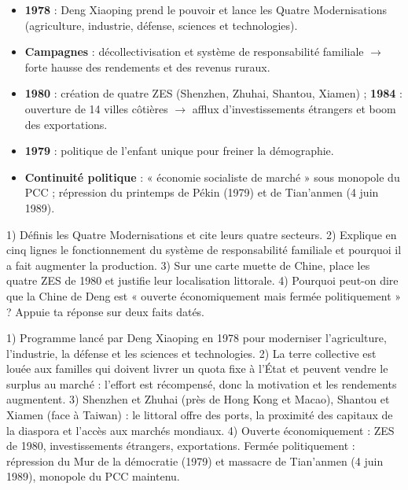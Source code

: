 \documentclass[11pt]{article}
\newcommand{\cle}[1]{{\popxbold\color{popdark}#1}}
\begin{document}
\begin{aretenir}
\begin{itemize}
\item \textbf{1978} : Deng Xiaoping prend le pouvoir et lance les \cle{Quatre Modernisations} (agriculture, industrie, défense, sciences et technologies).
\item \textbf{Campagnes} : décollectivisation et système de responsabilité familiale $\rightarrow$ forte hausse des rendements et des revenus ruraux.
\item \textbf{1980} : création de quatre \cle{ZES} (Shenzhen, Zhuhai, Shantou, Xiamen) ; \textbf{1984} : ouverture de 14 villes côtières $\rightarrow$ afflux d'investissements étrangers et boom des exportations.
\item \textbf{1979} : politique de l'\cle{enfant unique} pour freiner la démographie.
\item \textbf{Continuité politique} : « économie socialiste de marché » sous monopole du PCC ; répression du printemps de Pékin (1979) et de \cle{Tian'anmen} (4 juin 1989).
\end{itemize}
\end{aretenir}

\begin{exercice}
1) Définis les Quatre Modernisations et cite leurs quatre secteurs. 2) Explique en cinq lignes le fonctionnement du système de responsabilité familiale et pourquoi il a fait augmenter la production. 3) Sur une carte muette de Chine, place les quatre ZES de 1980 et justifie leur localisation littorale. 4) Pourquoi peut-on dire que la Chine de Deng est « ouverte économiquement mais fermée politiquement » ? Appuie ta réponse sur deux faits datés.
\end{exercice}

\begin{corrige}[Exercice]
1) Programme lancé par Deng Xiaoping en 1978 pour moderniser l'agriculture, l'industrie, la défense et les sciences et technologies. 2) La terre collective est louée aux familles qui doivent livrer un quota fixe à l'État et peuvent vendre le surplus au marché : l'effort est récompensé, donc la motivation et les rendements augmentent. 3) Shenzhen et Zhuhai (près de Hong Kong et Macao), Shantou et Xiamen (face à Taiwan) : le littoral offre des ports, la proximité des capitaux de la diaspora et l'accès aux marchés mondiaux. 4) Ouverte économiquement : ZES de 1980, investissements étrangers, exportations. Fermée politiquement : répression du Mur de la démocratie (1979) et massacre de Tian'anmen (4 juin 1989), monopole du PCC maintenu.
\end{corrige}
\end{document}
